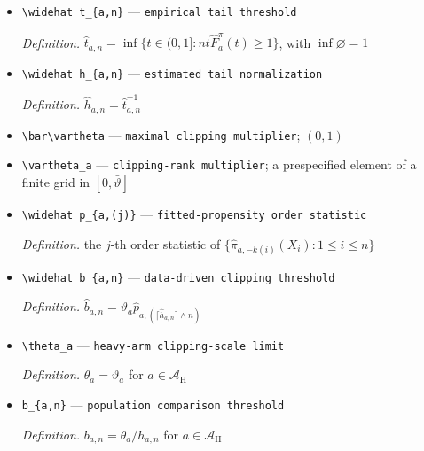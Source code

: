 \documentclass{article}
\begin{document}
\begin{itemize}
  \par\smallskip\noindent\emph{Definition.} \(\widehat F_a^{\pi}(t)=n^{-1}\sum_{i=1}^n\mathbf1\{\widehat\pi_{a,-k(i)}(X_i)\le t\}\)
  \item \texttt{\textbackslash{}\allowbreak{}widehat t\_\allowbreak{}\{a,\allowbreak{}n\}\allowbreak{}} --- \texttt{empirical tail threshold}
  \par\smallskip\noindent\emph{Definition.} \(\widehat t_{a,n}=\inf\{t\in(0,1]:nt\widehat F_a^{\pi}(t)\ge1\}\), with \(\inf\varnothing=1\)
  \item \texttt{\textbackslash{}\allowbreak{}widehat h\_\allowbreak{}\{a,\allowbreak{}n\}\allowbreak{}} --- \texttt{estimated tail normalization}
  \par\smallskip\noindent\emph{Definition.} \(\widehat h_{a,n}=\widehat t_{a,n}^{-1}\)
  \item \texttt{\textbackslash{}\allowbreak{}bar\textbackslash{}\allowbreak{}vartheta} --- \texttt{maximal clipping multiplier}; \((0,1)\)
  \item \texttt{\textbackslash{}\allowbreak{}vartheta\_\allowbreak{}a} --- \texttt{clipping-\allowbreak{}rank multiplier}; a prespecified element of a finite grid in \([0,\bar\vartheta]\)
  \item \texttt{\textbackslash{}\allowbreak{}widehat p\_\allowbreak{}\{a,\allowbreak{}(j)\}\allowbreak{}} --- \texttt{fitted-\allowbreak{}propensity order statistic}
  \par\smallskip\noindent\emph{Definition.} the \(j\)-th order statistic of \(\{\widehat\pi_{a,-k(i)}(X_i):1\le i\le n\}\)
  \item \texttt{\textbackslash{}\allowbreak{}widehat b\_\allowbreak{}\{a,\allowbreak{}n\}\allowbreak{}} --- \texttt{data-\allowbreak{}driven clipping threshold}
  \par\smallskip\noindent\emph{Definition.} \(\widehat b_{a,n}=\vartheta_a\widehat p_{a,(\lceil\widehat h_{a,n}\rceil\wedge n)}\)
  \item \texttt{\textbackslash{}\allowbreak{}theta\_\allowbreak{}a} --- \texttt{heavy-\allowbreak{}arm clipping-\allowbreak{}scale limit}
  \par\smallskip\noindent\emph{Definition.} \(\theta_a=\vartheta_a\) for \(a\in\mathcal A_{\mathrm H}\)
  \item \texttt{b\_\allowbreak{}\{a,\allowbreak{}n\}\allowbreak{}} --- \texttt{population comparison threshold}
  \par\smallskip\noindent\emph{Definition.} \(b_{a,n}=\theta_a/h_{a,n}\) for \(a\in\mathcal A_{\mathrm H}\)

\end{itemize}
\end{document}
